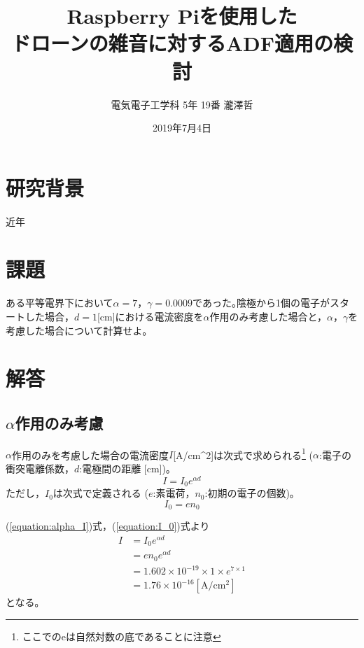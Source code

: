 \documentclass[a4paper, twocolumn]{ltjsarticle}
\title{Raspberry Piを使用した\\ドローンの雑音に対するADF適用の検討}
\author{電気電子工学科 5年 19番 瀧澤哲}
\date{2019年7月4日}
\begin{document}
%

\maketitle
  
\section{研究背景}
  近年

\section*{課題}
  ある平等電界下において\(\alpha = 7\)，\(\gamma = 0.0009\)であった｡陰極から1個の電子がスタートした場合，\(d=1\)[cm]における電流密度を\(\alpha\)作用のみ考慮した場合と，\(\alpha\)，\(\gamma\)を考慮した場合について計算せよ｡



\section*{解答}
  \subsection*{\(\alpha\)作用のみ考慮}
    \(\alpha\)作用のみを考慮した場合の電流密度\(I\)[A/cm^2]は次式で求められる\footnote{ここでのeは自然対数の底であることに注意} (\(\alpha\):電子の衝突電離係数，\(d\):電極間の距離 [cm])｡
    \begin{equation}
      I = I_0 e^{\alpha d} 
      \label{equation:alpha_I}
    \end{equation}
    ただし，\(I_0\)は次式で定義される (\(e\):素電荷，\(n_0\):初期の電子の個数)｡
    \begin{equation}
      I_0 = e n_0
      \label{equation:I_0}
    \end{equation}

    (\ref{equation:alpha_I})式，(\ref{equation:I_0})式より
    \begin{equation}
      \begin{split}
        I &= I_0 e^{\alpha d} \\
          &= e n_0 e^{\alpha d} \\
          &= 1.602 \times 10^{-19} \times 1 \times e^{7 \times 1} \\
          &= 1.76 \times 10^{-16} [\si{\ampere} / \si{\centi \meter ^ 2}]
      \end{split}
      \label{equation:alpha_I_answer}
    \end{equation} 
    となる｡
\end{document}
